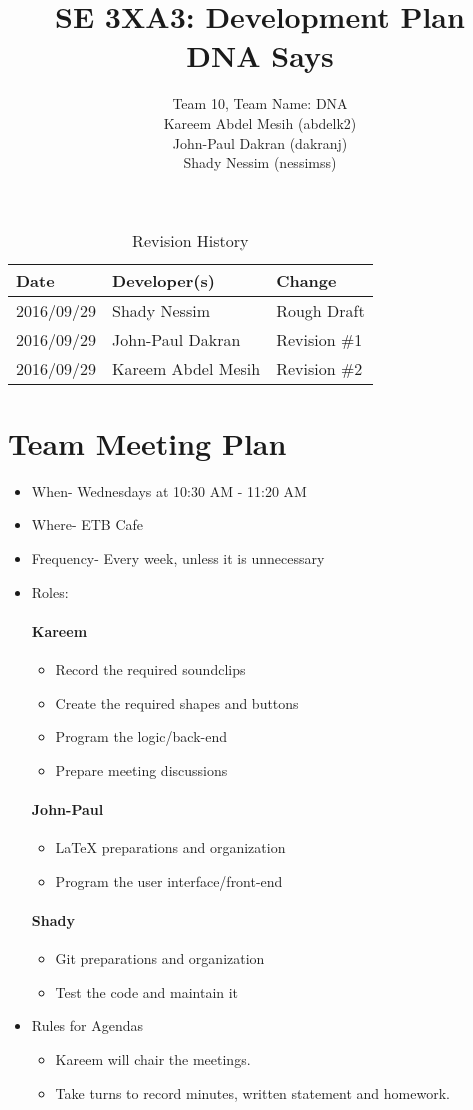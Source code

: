 \documentclass{article}
\title{SE 3XA3: Development Plan\\DNA Says}
\author{Team 10, Team Name: DNA
		\\ Kareem Abdel Mesih (abdelk2)
		\\ John-Paul Dakran (dakranj)
		\\ Shady Nessim (nessimss)
}
\date{}
\begin{document}
\begin{table}[hp]
\caption{Revision History} \label{TblRevisionHistory}
\begin{tabularx}{\textwidth}{llX}
\toprule
\textbf{Date} & \textbf{Developer(s)} & \textbf{Change}\\
\midrule
2016/09/29 & Shady Nessim & Rough Draft\\
2016/09/29 & John-Paul Dakran &  Revision \#1\\
2016/09/29 & Kareem Abdel Mesih &  Revision \#2\\
\bottomrule
\end{tabularx}
\end{table}
\newpage
\maketitle
\newpage
\section{Team Meeting Plan}
\begin{itemize}
\item When- Wednesdays at 10:30 AM - 11:20 AM
\item Where- ETB Cafe
\item Frequency- Every week, unless it is unnecessary 
\item Roles:
\paragraph{Kareem}
\begin{itemize}
\item Record the required soundclips
\item Create the required shapes and buttons
\item Program the logic/back-end
\item Prepare meeting discussions
\end{itemize}
\paragraph{John-Paul}
\begin{itemize}
\item LaTeX preparations and organization
\item Program the user interface/front-end
\end{itemize}
\paragraph{Shady}
\begin{itemize}
\item Git preparations and organization
\item Test the code and maintain it
\end{itemize}
\item Rules for Agendas
\begin{itemize}
\item Kareem will chair the meetings.
\item Take turns to record minutes, written statement and homework.
\end{itemize}
\end{itemize}
\end{document}
